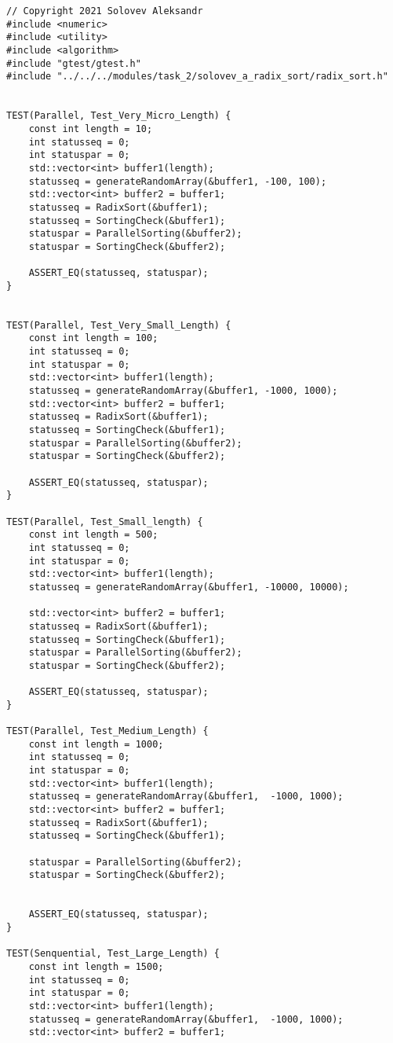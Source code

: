 \documentclass{report}
\begin{document}
\begin{lstlisting}
// Copyright 2021 Solovev Aleksandr
#include <numeric>
#include <utility>
#include <algorithm>
#include "gtest/gtest.h"
#include "../../../modules/task_2/solovev_a_radix_sort/radix_sort.h"


TEST(Parallel, Test_Very_Micro_Length) {
    const int length = 10;
    int statusseq = 0;
    int statuspar = 0;
    std::vector<int> buffer1(length);
    statusseq = generateRandomArray(&buffer1, -100, 100);
    std::vector<int> buffer2 = buffer1;
    statusseq = RadixSort(&buffer1);
    statusseq = SortingCheck(&buffer1);
    statuspar = ParallelSorting(&buffer2);
    statuspar = SortingCheck(&buffer2);

    ASSERT_EQ(statusseq, statuspar);
}


TEST(Parallel, Test_Very_Small_Length) {
    const int length = 100;
    int statusseq = 0;
    int statuspar = 0;
    std::vector<int> buffer1(length);
    statusseq = generateRandomArray(&buffer1, -1000, 1000);
    std::vector<int> buffer2 = buffer1;
    statusseq = RadixSort(&buffer1);
    statusseq = SortingCheck(&buffer1);
    statuspar = ParallelSorting(&buffer2);
    statuspar = SortingCheck(&buffer2);

    ASSERT_EQ(statusseq, statuspar);
}

TEST(Parallel, Test_Small_length) {
    const int length = 500;
    int statusseq = 0;
    int statuspar = 0;
    std::vector<int> buffer1(length);
    statusseq = generateRandomArray(&buffer1, -10000, 10000);

    std::vector<int> buffer2 = buffer1;
    statusseq = RadixSort(&buffer1);
    statusseq = SortingCheck(&buffer1);
    statuspar = ParallelSorting(&buffer2);
    statuspar = SortingCheck(&buffer2);

    ASSERT_EQ(statusseq, statuspar);
}

TEST(Parallel, Test_Medium_Length) {
    const int length = 1000;
    int statusseq = 0;
    int statuspar = 0;
    std::vector<int> buffer1(length);
    statusseq = generateRandomArray(&buffer1,  -1000, 1000);
    std::vector<int> buffer2 = buffer1;
    statusseq = RadixSort(&buffer1);
    statusseq = SortingCheck(&buffer1);

    statuspar = ParallelSorting(&buffer2);
    statuspar = SortingCheck(&buffer2);


    ASSERT_EQ(statusseq, statuspar);
}

TEST(Senquential, Test_Large_Length) {
    const int length = 1500;
    int statusseq = 0;
    int statuspar = 0;
    std::vector<int> buffer1(length);
    statusseq = generateRandomArray(&buffer1,  -1000, 1000);
    std::vector<int> buffer2 = buffer1;


\end{lstlisting}
\end{document}
